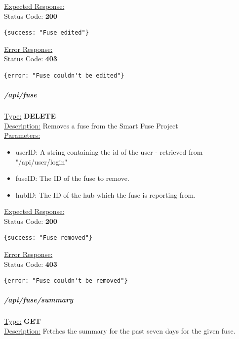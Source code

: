 \documentclass[draft,preprint,12pt,3p]{elsarticle}
\newcommand{\forceindent}{\leavevmode{\parindent=1em\indent}}
\begin{document}
\underline{Expected Response:}\\[5pt]
\forceindent Status Code: \textbf{200} \\
\begin{verbatim}
{success: "Fuse edited"}
\end{verbatim}
\underline{Error Response:}\\[5pt]
\forceindent Status Code: \textbf{403} \\
\begin{verbatim}
{error: "Fuse couldn't be edited"}
\end{verbatim}

\subparagraph*{/api/fuse}
\underline{Type:} \textbf{DELETE}\\

\underline{Description:} Removes a fuse from the Smart Fuse Project\\

\underline{Parameters:}
\begin{itemize}
\item userID: A string containing the id of the user - retrieved from "/api/user/login"

\item fuseID: The ID of the fuse to remove.

\item hubID: The ID of the hub which the fuse is reporting from.

\end{itemize}
\underline{Expected Response:}\\[5pt]
\forceindent Status Code: \textbf{200} \\
\begin{verbatim}
{success: "Fuse removed"}
\end{verbatim}
\underline{Error Response:}\\[5pt]
\forceindent Status Code: \textbf{403} \\
\begin{verbatim}
{error: "Fuse couldn't be removed"}
\end{verbatim}

\subparagraph*{/api/fuse/summary}
\underline{Type:} \textbf{GET}\\

\underline{Description:} Fetches the summary for the past seven days for the given fuse.\\
\end{document}
